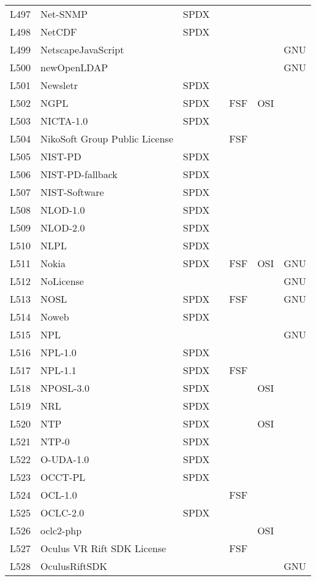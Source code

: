 \begin{longtable}[h]{m{2cm} | m{7cm} | c | c | c | c | c}
  L497 & Net-SNMP & SPDX &  &  &  &  \\
  L498 & NetCDF & SPDX &  &  &  &  \\
  L499 & NetscapeJavaScript &  &  &  &  & GNU \\
  L500 & newOpenLDAP &  &  &  &  & GNU \\
  L501 & Newsletr & SPDX &  &  &  &  \\
  L502 & NGPL & SPDX &  & FSF & OSI &  \\
  L503 & NICTA-1.0 & SPDX &  &  &  &  \\
  L504 & NikoSoft Group Public License &  &  & FSF &  &  \\
  L505 & NIST-PD & SPDX &  &  &  &  \\
  L506 & NIST-PD-fallback & SPDX &  &  &  &  \\
  L507 & NIST-Software & SPDX &  &  &  &  \\
  L508 & NLOD-1.0 & SPDX &  &  &  &  \\
  L509 & NLOD-2.0 & SPDX &  &  &  &  \\
  L510 & NLPL & SPDX &  &  &  &  \\
  L511 & Nokia & SPDX &  & FSF & OSI & GNU \\
  L512 & NoLicense &  &  &  &  & GNU \\
  L513 & NOSL & SPDX &  & FSF &  & GNU \\
  L514 & Noweb & SPDX &  &  &  &  \\
  L515 & NPL &  &  &  &  & GNU \\
  L516 & NPL-1.0 & SPDX &  &  &  &  \\
  L517 & NPL-1.1 & SPDX &  & FSF &  &  \\
  L518 & NPOSL-3.0 & SPDX &  &  & OSI &  \\
  L519 & NRL & SPDX &  &  &  &  \\
  L520 & NTP & SPDX &  &  & OSI &  \\
  L521 & NTP-0 & SPDX &  &  &  &  \\
  L522 & O-UDA-1.0 & SPDX &  &  &  &  \\
  L523 & OCCT-PL & SPDX &  &  &  &  \\
  L524 & OCL-1.0 &  &  & FSF &  &  \\
  L525 & OCLC-2.0 & SPDX &  &  &  &  \\
  L526 & oclc2-php &  &  &  & OSI &  \\
  L527 & Oculus VR Rift SDK License &  &  & FSF &  &  \\
  L528 & OculusRiftSDK &  &  &  &  & GNU \\

\end{longtable}

